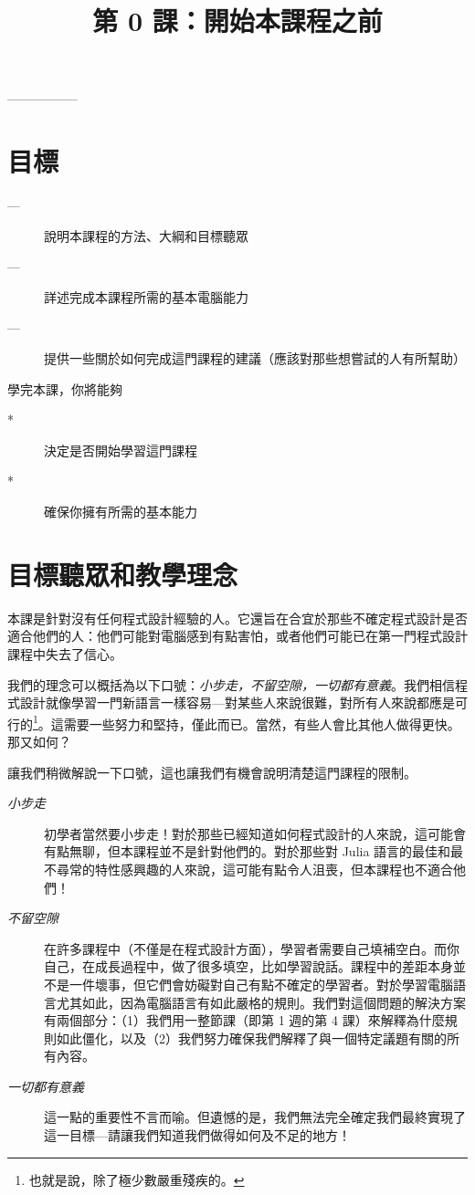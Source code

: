 \documentclass[]{article}
\begin{document}
\author{}  \date{}
\title{第 0 課：開始本課程之前}
\maketitle

\vspace{-4em}
-----------------

\section*{目標}

\begin{description}
	\item[---] 說明本課程的方法、大綱和目標聽眾
	\item[---] 詳述完成本課程所需的基本電腦能力
	\item[---] 提供一些關於如何完成這門課程的建議（應該對那些想嘗試的人有所幫助）
\end{description}

學完本課，你將能夠
\begin{description}
	\item[*] 決定是否開始學習這門課程
	\item[*] 確保你擁有所需的基本能力
\end{description}

\section*{目標聽眾和教學理念}

本課是針對沒有任何程式設計經驗的人。它還旨在合宜於那些不確定程式設計是否適合他們的人：他們可能對電腦感到有點害怕，或者他們可能已在第一門程式設計課程中失去了信心。

我們的理念可以概括為以下口號：\emph{小步走，不留空隙，一切都有意義}。我們相信程式設計就像學習一門新語言一樣容易---對某些人來說很難，對所有人來說都應是可行的\footnote{也就是說，除了極少數嚴重殘疾的。}。這需要一些努力和堅持，僅此而已。當然，有些人會比其他人做得更快。那又如何？

讓我們稍微解說一下口號，這也讓我們有機會說明清楚這門課程的限制。

\begin{description}
	\item[\emph{小步走}] 初學者當然要小步走！對於那些已經知道如何程式設計的人來說，這可能會有點無聊，但本課程並不是針對他們的。對於那些對 Julia 語言的最佳和最不尋常的特性感興趣的人來說，這可能有點令人沮喪，但本課程也不適合他們！
  \item[\emph{不留空隙}] 在許多課程中（不僅是在程式設計方面），學習者需要自己填補空白。而你自己，在成長過程中，做了很多填空，比如學習說話。課程中的差距本身並不是一件壞事，但它們會妨礙對自己有點不確定的學習者。對於學習電腦語言尤其如此，因為電腦語言有如此嚴格的規則。我們對這個問題的解決方案有兩個部分：（1）我們用一整節課（即第 1 週的第 4 課）來解釋為什麼規則如此僵化，以及（2）我們努力確保我們解釋了與一個特定議題有關的所有內容。
  \item[\emph{一切都有意義}] 這一點的重要性不言而喻。但遺憾的是，我們無法完全確定我們最終實現了這一目標---請讓我們知道我們做得如何及不足的地方！
\end{description}
\end{document}
